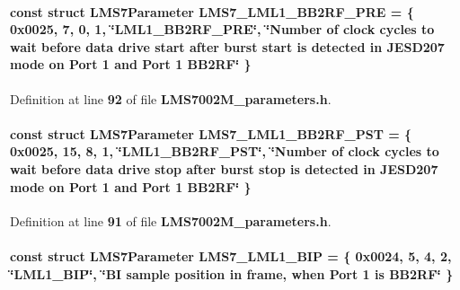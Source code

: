 \paragraph[{L\+M\+S7\+\_\+\+L\+M\+L1\+\_\+\+B\+B2\+R\+F\+\_\+\+P\+RE}]{\setlength{\rightskip}{0pt plus 5cm}const struct {\bf L\+M\+S7\+Parameter} L\+M\+S7\+\_\+\+L\+M\+L1\+\_\+\+B\+B2\+R\+F\+\_\+\+P\+RE = \{ 0x0025, 7, 0, 1, \char`\"{}\+L\+M\+L1\+\_\+\+B\+B2\+R\+F\+\_\+\+P\+R\+E\char`\"{}, \char`\"{}\+Number of clock cycles to wait before data drive start after burst start is detected in J\+E\+S\+D207 mode on Port 1 and Port 1 B\+B2\+R\+F\char`\"{} \}\hspace{0.3cm}{\ttfamily [static]}}\label{LMS7002M__parameters_8h_ad5e434c054860dbf4ef419d4411698bf}


Definition at line {\bf 92} of file {\bf L\+M\+S7002\+M\+\_\+parameters.\+h}.

\paragraph[{L\+M\+S7\+\_\+\+L\+M\+L1\+\_\+\+B\+B2\+R\+F\+\_\+\+P\+ST}]{\setlength{\rightskip}{0pt plus 5cm}const struct {\bf L\+M\+S7\+Parameter} L\+M\+S7\+\_\+\+L\+M\+L1\+\_\+\+B\+B2\+R\+F\+\_\+\+P\+ST = \{ 0x0025, 15, 8, 1, \char`\"{}\+L\+M\+L1\+\_\+\+B\+B2\+R\+F\+\_\+\+P\+S\+T\char`\"{}, \char`\"{}\+Number of clock cycles to wait before data drive stop after burst stop is detected in J\+E\+S\+D207 mode on Port 1 and Port 1 B\+B2\+R\+F\char`\"{} \}\hspace{0.3cm}{\ttfamily [static]}}\label{LMS7002M__parameters_8h_ab8bc27c78dd3dfe920299b2b3e96b8e4}


Definition at line {\bf 91} of file {\bf L\+M\+S7002\+M\+\_\+parameters.\+h}.

\paragraph[{L\+M\+S7\+\_\+\+L\+M\+L1\+\_\+\+B\+IP}]{\setlength{\rightskip}{0pt plus 5cm}const struct {\bf L\+M\+S7\+Parameter} L\+M\+S7\+\_\+\+L\+M\+L1\+\_\+\+B\+IP = \{ 0x0024, 5, 4, 2, \char`\"{}\+L\+M\+L1\+\_\+\+B\+I\+P\char`\"{}, \char`\"{}\+B\+I sample position in frame, when Port 1 is B\+B2\+R\+F\char`\"{} \}\hspace{0.3cm}{\ttfamily [static]}}\label{LMS7002M__parameters_8h_a3bd331212a19c0533873d9a55e4abd36}


